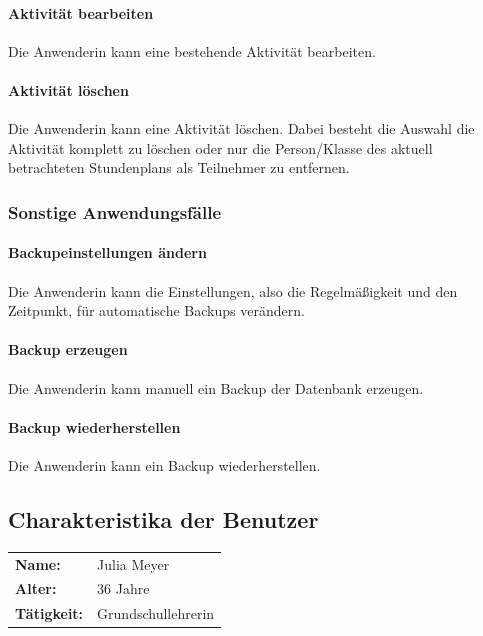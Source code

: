 \documentclass[fontsize=12pt,paper=a4,twoside]{scrartcl}
\begin{document}
\paragraph{Aktivität bearbeiten}
Die Anwenderin kann eine bestehende Aktivität bearbeiten. \\

\paragraph{Aktivität löschen}
Die Anwenderin kann eine Aktivität löschen. Dabei besteht die Auswahl die Aktivität komplett zu löschen oder nur die Person/Klasse des aktuell betrachteten Stundenplans als Teilnehmer zu entfernen.





\subsubsection{Sonstige Anwendungsfälle}

\paragraph{Backupeinstellungen \"andern}
Die Anwenderin kann die Einstellungen, also die Regelmäßigkeit und den Zeitpunkt, für automatische Backups verändern.

\paragraph{Backup erzeugen}
Die Anwenderin kann manuell ein Backup der Datenbank erzeugen.

\paragraph{Backup wiederherstellen}
Die Anwenderin kann ein Backup wiederherstellen.


\subsection{Charakteristika der Benutzer}

\begin{tabular}{p{3cm}l}
\textbf{Name:} & Julia Meyer \\
\textbf{Alter:} & 36 Jahre\\
\textbf{Tätigkeit:} &  Grundschullehrerin\\
\end{tabular} \\
\end{document}
